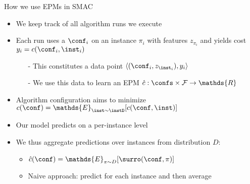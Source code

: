

\begin{frame}[c]{How we use EPMs in SMAC}

\begin{itemize}
  \item We keep track of all algorithm runs we execute
  \item Each run uses a $\conf_i$ on an instance $\pi_i$ with features $z_{\pi_i}$ and yields cost $y_i=c(\conf_i,\inst_i)$
  \begin{itemize}
  	\item[-] This constitutes a data point $\langle{} (\conf_i, z_{\inst_i}), y_i \rangle$
  	\item[-] We use this data to learn an EPM $\hat{c}: \confs \times \mathcal{F} \rightarrow \mathds{R}$
  \end{itemize}
  
  \pause
  \bigskip
  
  \item Algorithm configuration aims to minimize \alert{$c(\conf) = \mathds{E}_{\inst \sim \instD} [c(\conf,\inst)]$}
  \item Our model predicts on a per-instance level 
  \item We thus aggregate predictions over instances from distribution $D$:
  \begin{itemize}
  	\item \alert{$\hat{c}(\conf) = \mathds{E}_{\pi \sim D} [\surro(\conf, \pi)]$}
  	\item Naive approach: predict for each instance and then average
  \end{itemize}
  
\end{itemize}

\end{frame}

